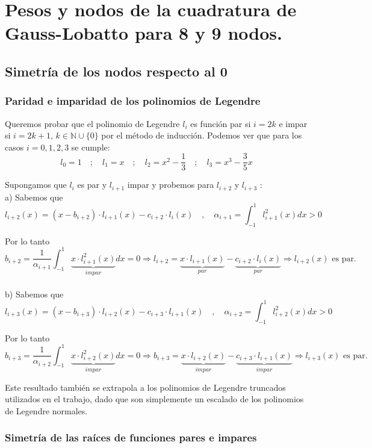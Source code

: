 \documentclass[a4paper]{article}
\begin{document}
\newpage
\section{Pesos y nodos de la cuadratura de Gauss-Lobatto para 8 y 9 nodos.}

\subsection{Simetría de los nodos respecto al 0}

\subsubsection{Paridad e imparidad de los polinomios de Legendre}

Queremos probar que el polinomio de Legendre $l_i$ es función par si $i=2k$ e impar si $i=2k+1$, $k\in\mathbb{N}\cup\{0\}$ por el método de inducción. Podemos ver que para los casos $i=0, 1, 2, 3$ se cumple:
\[l_0=1\quad;\quad l_1=x\quad;\quad l_2=x^2-\frac{1}{3}\quad;\quad l_3=x^3-\frac{3}{5}x \]

Supongamos que $l_i$ es par y $l_{i+1}$ impar y probemos para $l_{i+2}$ y $l_{i+3}$ :\\

a) Sabemos que
\[l_{i+2}(x)=(x-b_{i+2})\cdot l_{i+1}(x)-c_{i+2}\cdot l_i(x)\quad, \quad\alpha_{i+1}=\int_{-1}^1l_{i+1}^2(x)dx>0\]

Por lo tanto\[b_{i+2}=\frac{1}{\alpha_{i+1}} \int_{-1}^1\underbrace{x\cdot l_{i+1}^2(x)}_{impar}dx=0\Rightarrow l_{i+2}=\underbrace{x\cdot l_{i+1}(x)}_{par}-\underbrace{c_{i+2}\cdot l_i(x)}_{par}\Rightarrow l_{i+2}(x)\text{ es par.}\]\\

b) Sabemos que
\[l_{i+3}(x)=(x-b_{i+3})\cdot l_{i+2}(x)-c_{i+3}\cdot l_{i+1}(x)\quad,\quad\alpha_{i+2}=\int_{-1}^1l_{i+2}^2(x)dx>0\] 

Por lo tanto \[b_{i+3}=\frac{1}{\alpha_{i+2}}\int_{-1}^1\underbrace{x\cdot l_{i+2}^2(x)}_{impar}dx=0
\Rightarrow b_{i+3}=\underbrace{x\cdot l_{i+2}(x)}_{impar}-\underbrace{c_{i+3}\cdot l_{i+1}(x)}_{impar}\Rightarrow l_{i+3}(x)\text{ es par.}\]

Este resultado también se extrapola a los polinomios de Legendre truncados utilizados en el trabajo, dado que son simplemente un escalado de los polinomios de Legendre normales.

\subsubsection{Simetría de las raíces de funciones pares e impares}
\end{document}
